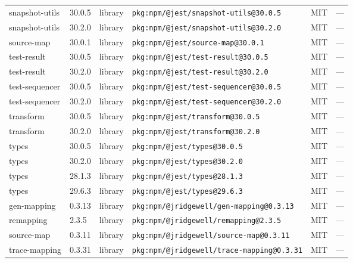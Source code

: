 \documentclass[11pt,a4paper]{article}
\begin{document}
\begin{longtable}{|p{4cm}|p{2cm}|p{1.6cm}|p{5cm}|p{1.5cm}|p{3.5cm}|}
\raggedright snapshot-utils & 30.0.5 & library & \small\texttt{pkg:npm/@jest/snapshot-utils@30.0.5} & MIT & \small — \\
\raggedright snapshot-utils & 30.2.0 & library & \small\texttt{pkg:npm/@jest/snapshot-utils@30.2.0} & MIT & \small — \\
\raggedright source-map & 30.0.1 & library & \small\texttt{pkg:npm/@jest/source-map@30.0.1} & MIT & \small — \\
\raggedright test-result & 30.0.5 & library & \small\texttt{pkg:npm/@jest/test-result@30.0.5} & MIT & \small — \\
\raggedright test-result & 30.2.0 & library & \small\texttt{pkg:npm/@jest/test-result@30.2.0} & MIT & \small — \\
\raggedright test-sequencer & 30.0.5 & library & \small\texttt{pkg:npm/@jest/test-sequencer@30.0.5} & MIT & \small — \\
\raggedright test-sequencer & 30.2.0 & library & \small\texttt{pkg:npm/@jest/test-sequencer@30.2.0} & MIT & \small — \\
\raggedright transform & 30.0.5 & library & \small\texttt{pkg:npm/@jest/transform@30.0.5} & MIT & \small — \\
\raggedright transform & 30.2.0 & library & \small\texttt{pkg:npm/@jest/transform@30.2.0} & MIT & \small — \\
\raggedright types & 30.0.5 & library & \small\texttt{pkg:npm/@jest/types@30.0.5} & MIT & \small — \\
\raggedright types & 30.2.0 & library & \small\texttt{pkg:npm/@jest/types@30.2.0} & MIT & \small — \\
\raggedright types & 28.1.3 & library & \small\texttt{pkg:npm/@jest/types@28.1.3} & MIT & \small — \\
\raggedright types & 29.6.3 & library & \small\texttt{pkg:npm/@jest/types@29.6.3} & MIT & \small — \\
\raggedright gen-mapping & 0.3.13 & library & \small\texttt{pkg:npm/@jridgewell/gen-mapping@0.3.13} & MIT & \small — \\
\raggedright remapping & 2.3.5 & library & \small\texttt{pkg:npm/@jridgewell/remapping@2.3.5} & MIT & \small — \\
\raggedright source-map & 0.3.11 & library & \small\texttt{pkg:npm/@jridgewell/source-map@0.3.11} & MIT & \small — \\
\raggedright trace-mapping & 0.3.31 & library & \small\texttt{pkg:npm/@jridgewell/trace-mapping@0.3.31} & MIT & \small — \\

\end{longtable}
\end{document}
